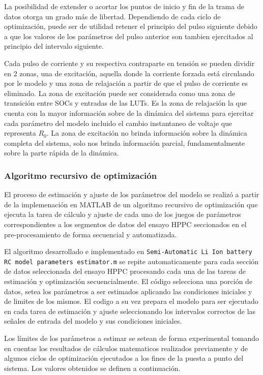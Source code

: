 \documentclass[10pt, a4paper]{article}
\begin{document}
La posibilidad de extender o acortar los puntos de inicio y fin de la trama de
datos otorga un grado más de libertad. Dependiendo de cada ciclo de
optimización, puede ser de utilidad retener el principio del pulso siguiente
debido a que los valores de los parámetros del pulso anterior son tambien
ejercitados al principio del intervalo siguiente. 

Cada pulso de corriente y su respectiva contraparte en tensión se pueden dividir
en 2 zonas, una de excitación, aquella donde la corriente forzada está
circulando por le modelo y una zona de relajación a partir de que el pulso de
corriente es eliminado. La zona de excitación puede ser considerada como una
zona de transición entre \acrshort{SOC}s y entradas de las \acrshort{LUT}s.
Es la zona de relajación la que cuenta con la mayor información sobre de la
dinámica del sistema para ejercitar cada parámetro del modelo incluido el cambio
instantaneo de voltaje que representa $R_{0}$. La zona de excitación no 
brinda información sobre la dinámica completa del sistema, solo nos
brinda información parcial, fundamentalmente sobre la parte rápida de la
dinámica. 

\subsubsection{Algoritmo recursivo de optimizaci\'on}

El proceso de estimación y ajuste de los parámetros del modelo se realizó a
partir de la implemenación en MATLAB de un algoritmo recursivo de optimización
que ejecuta la tarea de cálculo y ajuste de cada uno de los juegos de parámetros
correspondientes a los segmentos de datos del ensayo \acrshort{HPPC} seccionados
en el pre-procesamiento de forma secuencial y automatizada.

El algoritmo desarrollado e implementado en \texttt{Semi-Automatic Li Ion
battery RC model parameters estimator.m} se repite automaticamente para cada
sección de datos seleccionada del ensayo \acrshort{HPPC} procesando cada una de
las tareas de estimación y optimización secuencialmente. El código selecciona
una porción de datos, setea los parámetros a ser estimados aplicando las
condiciones iniciales y de limites de los mismos. El codigo a su vez prepara el
modelo para ser ejecutado en cada tarea de estimación y ajuste seleccionando los
intervalos correctos de las señales de entrada del modelo y sus condiciones
iniciales.

Los límites de los parámetros a estimar se setean de forma experimental tomando
en cuentas los resultados de cálculos matematicos realizados previamente y de
algunos ciclos de optimización ejecutados a los fines de la puesta a punto del
sistema. Los valores obtenidos se definen a continuación. 
\end{document}
